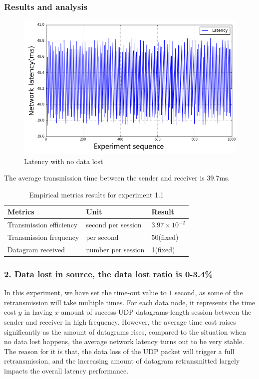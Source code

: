 \documentclass[11pt,openright,a4paper]{report}
\begin{document}
\subsubsection{Results and analysis}
\begin{figure}[H]
\centering
\includegraphics[width=0.6\linewidth]{picture/experiments/exp1/latency}
\caption{Latency with no data lost}
\label{fig:latency}
\end{figure}
The average transmission time between the sender and receiver is 39.7ms. 
\begin{table}[H]
	\centering
	\caption{Empirical metrics results for experiment 1.1}
	\label{my-label}
	\begin{tabular}{@{}lll@{}}
		\toprule
		Metrics                 & Unit               & Result                 \\ \midrule
		Transmission efficiency & second per session & $3.97\times 10^{-2}$ \\
		Transmission frequency  & per second        & 50(fixed)              \\
		Datagram received       & number per session & 1(fixed)            \\ \bottomrule
	\end{tabular}
\end{table}

\subsubsection{2. Data lost in source, the data lost ratio is 0-3.4\%}
In this experiment, we have set the time-out value to $1$ second, as some of the retransmission will take multiple times. For each data node, it represents the time cost $y$ in having $x$ amount of success UDP datagrams-length session between the sender and receiver in high frequency. However, the average time cost raises significantly as the amount of datagrams rises, compared to the situation when no data lost happens, the average network latency turns out to be very stable. The reason for it is that, the data loss of the UDP packet will trigger a full retransmission, and the increasing amount of datagram retransmitted largely impacts the overall latency performance.\\
\end{document}
